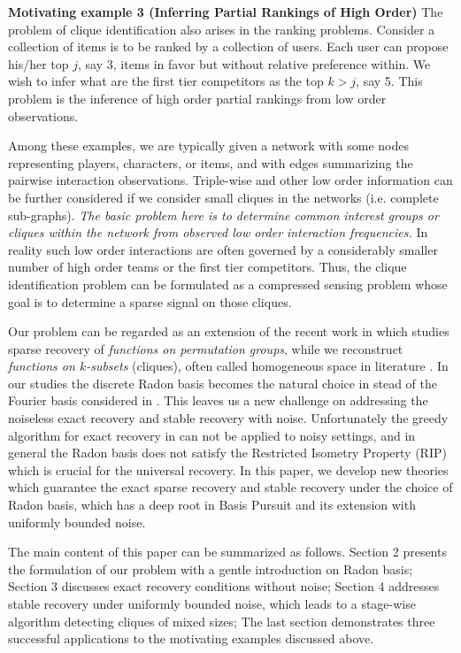 \documentclass{article}
\begin{document}
\textbf{Motivating example 3 (Inferring Partial Rankings of High Order)}
The problem of clique identification also arises in the ranking problems.
Consider a collection of items is to be ranked by a collection of users. 
Each user can propose his/her top $j$, say 3, items in favor but without relative preference within. We wish to infer what are the first tier competitors as the top $k>j$, say 5. This problem is the inference of high order partial rankings from low order observations.

Among these examples, we are typically given a network with some nodes representing players, characters, or items, and with edges summarizing the pairwise interaction observations. Triple-wise and other low order information can be further considered if we consider small cliques in the networks 
(i.e. complete sub-graphs). {\it The basic problem here is to determine common interest groups or cliques within the network from observed low order interaction frequencies.} 
In reality such low order interactions are often governed by a considerably smaller number of high order 
teams or the first tier competitors. Thus, the clique identification problem can be 
formulated as a compressed sensing problem whose goal is to 
determine a sparse signal on those cliques.

Our problem can be regarded as an extension of the recent work in \cite{JagSha08} which studies sparse recovery of \emph{functions on permutation groups}, while we reconstruct \emph{functions on $k$-subsets} (cliques), often called homogeneous space in literature \cite{Persi88}. In our studies the discrete Radon basis becomes the natural choice in stead of the Fourier basis considered in \cite{JagSha08}. This leaves us a new challenge on addressing the noiseless exact recovery and stable recovery with noise. Unfortunately the greedy algorithm for exact recovery in \cite{JagSha08} can not be applied to noisy settings, and in general the Radon basis does not satisfy the Restricted Isometry Property (RIP) \cite{Candes08} which is crucial for the universal recovery. In this paper, we develop new theories which guarantee the exact sparse recovery and stable recovery under the choice of Radon basis, which has a deep root in Basis Pursuit \cite{CheDonSau99} and its extension with uniformly bounded noise. 

The main content of this paper can be summarized as follows. Section 2 presents the formulation of our problem with a gentle introduction on Radon basis; Section 3 discusses exact recovery conditions without noise; Section 4 addresses stable recovery under uniformly bounded noise, which leads to a stage-wise algorithm detecting cliques of mixed sizes;  The last section demonstrates three successful applications to the motivating examples discussed above.
\end{document}
